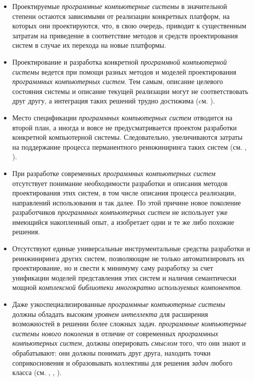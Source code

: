 \begin{SCn}
\begin{scnsubstruct}
\begin{scnsubstruct}
\begin{scnindent}
\begin{scnindent}
{			\begin{itemize}
				\item Проектируемые \textit{программные компьютерные системы} в значительной степени остаются зависимыми от реализации конкретных платформ, на которых они проектируются, что, в свою очередь, приводит к существенным затратам на приведение в соответствие методов и средств проектирования систем в случае их перехода на новые платформы.
				\item Проектирование и разработка конкретной \textit{программной компьютерной системы} ведется при помощи разных методов и моделей проектирования \textit{программных компьютерных систем}. Тем самым, описание целевого состояния системы и описание текущей реализации могут не соответствовать друг другу, а интеграция таких решений трудно достижима (cм. \cite{Sokolov2021}).
				\item Место спецификации \textit{программных компьютерных систем} отводится на второй план, а иногда и вовсе не предусматривается проектом разработки конкретной компьютерной системы. Следовательно, увеличиваются затраты на поддержание процесса перманентного реинжиниринга таких систем (см. \cite{Dillon2007}, \cite{Dillon2008}).
				\item При разработке современных \textit{программных компьютерных систем} отсутствует понимание необходимости разработки и описания методов проектирования этих систем, в том числе описания процесса реализации, направлений использования и так далее. По этой причине новое поколение разработчиков \textit{программных компьютерных систем} не использует уже имеющийся накопленный опыт, а изобретает одни и те же либо похожие решения.
				\item Отсутствуют единые универсальные инструментальные средства разработки и реинжиниринга других систем, позволяющие не только автоматизировать их проектирование, но и свести к минимуму саму разработку за счет унификации моделей представления этих систем и наличия семантически мощной \textit{комплексной библиотеки многократно используемых компонентов}.
				\item Даже узкоспециализированные \textit{программные компьютерные системы} должны обладать высоким \textit{уровнем интеллекта} для расширения возможностей в решении более сложных задач. \textit{программные компьютерные системы нового поколения} в отличие от современных \textit{программных компьютерных систем}, должны оперировать \textit{смыслом} того, что они знают и обрабатывают: они должны понимать друг друга, находить точки соприкосновения и образовывать коллективы для решения \textit{задач} любого класса (см. \cite{Ouksel1999}, \cite{Neiva2016}, \cite{Lu2022}).

\end{itemize}}
\end{scnindent}
\end{scnindent}
\end{scnsubstruct}
\end{scnsubstruct}
\end{SCn}

